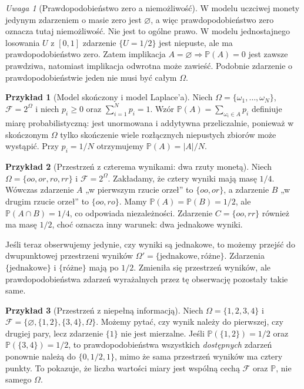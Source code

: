 \documentclass[11pt,a4paper,oneside]{report}
\numberwithin{equation}{chapter}
\theoremstyle{plain}
\theoremstyle{definition}
\newtheorem{przyklad}{Przykład}[chapter]
\theoremstyle{remark}
\newtheorem{uwaga}{Uwaga}[chapter]
\newcommand{\Prob}{\mathbb{P}}
\begin{document}
\begin{uwaga}[Prawdopodobieństwo zero a niemożliwość]
W modelu uczciwej monety jedynym zdarzeniem o masie zero jest
$\varnothing$, a więc prawdopodobieństwo zero oznacza tutaj
niemożliwość. Nie jest to ogólne prawo. W modelu jednostajnego
losowania $U$ z $[0,1]$ zdarzenie $\{U=1/2\}$ jest niepuste,
ale ma prawdopodobieństwo zero. Zatem implikacja
$A=\varnothing\Rightarrow\Prob(A)=0$ jest zawsze prawdziwa,
natomiast implikacja odwrotna może zawieść. Podobnie zdarzenie
o prawdopodobieństwie jeden nie musi być całym $\Omega$.
\end{uwaga}

\begin{przyklad}[Model skończony i model Laplace'a]
Niech $\Omega=\{\omega_1,\ldots,\omega_N\}$,
$\mathcal F=2^\Omega$ i niech $p_i\geq0$ oraz $\sum_{i=1}^N p_i=1$.
Wzór $\Prob(A)=\sum_{\omega_i\in A}p_i$ definiuje miarę
probabilistyczną: jest unormowana i addytywna przeliczalnie,
ponieważ w skończonym $\Omega$ tylko skończenie wiele rozłącznych
niepustych zbiorów może wystąpić. Przy $p_i=1/N$ otrzymujemy
$\Prob(A)=|A|/N$.
\end{przyklad}


\begin{przyklad}[Przestrzeń z czterema wynikami: dwa rzuty monetą]
Niech $\Omega=\{oo,or,ro,rr\}$ i $\mathcal F=2^\Omega$.
Zakładamy, że cztery wyniki mają masę $1/4$.
Wówczas zdarzenie $A$ „w pierwszym rzucie orzeł” to
$\{oo,or\}$, a zdarzenie $B$ „w drugim rzucie orzeł”
to $\{oo,ro\}$. Mamy $\Prob(A)=\Prob(B)=1/2$,
ale $\Prob(A\cap B)=1/4$, co odpowiada niezależności.
Zdarzenie $C=\{oo,rr\}$ również ma masę $1/2$,
choć oznacza inny warunek: dwa jednakowe wyniki.

Jeśli teraz obserwujemy jedynie, czy wyniki są jednakowe,
to możemy przejść do dwupunktowej przestrzeni wyników
$\Omega'=\{\text{jednakowe},\text{różne}\}$.
Zdarzenia $\{\text{jednakowe}\}$ i
$\{\text{różne}\}$ mają po $1/2$. Zmieniła się przestrzeń
wyników, ale prawdopodobieństwa zdarzeń wyrażalnych
przez tę obserwację pozostały takie same.
\end{przyklad}

\begin{przyklad}[Przestrzeń z niepełną informacją]
Niech $\Omega=\{1,2,3,4\}$ i
$\mathcal F=\{\varnothing,\{1,2\},\{3,4\},\Omega\}$.
Możemy pytać, czy wynik należy do pierwszej, czy drugiej
pary, lecz zdarzenie $\{1\}$ nie jest mierzalne.
Jeśli $\Prob(\{1,2\})=1/2$ oraz
$\Prob(\{3,4\})=1/2$, to prawdopodobieństwa wszystkich
\emph{dostępnych} zdarzeń ponownie należą do
$\{0,1/2,1\}$, mimo że sama przestrzeń wyników ma cztery
punkty. To pokazuje, że liczba wartości miary jest wspólną
cechą $\mathcal F$ oraz $\Prob$, nie samego $\Omega$.
\end{przyklad}
\end{document}
